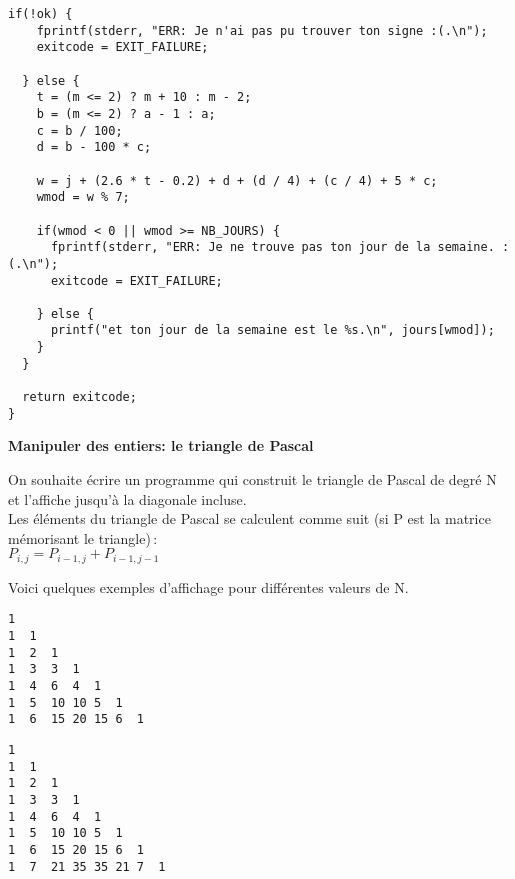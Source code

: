 \documentclass[10pt]{article}\usepackage[enonce]{exemptty}
\begin{document}
\begin{Reponse}
\begin{minipage}{\linewidth}
\begin{Verbatim}[label=Reponse aux 3 questions de l'exercice 2 proposee par Julien]
  if(!ok) {
    fprintf(stderr, "ERR: Je n'ai pas pu trouver ton signe :(.\n");
    exitcode = EXIT_FAILURE;

  } else {
    t = (m <= 2) ? m + 10 : m - 2;
    b = (m <= 2) ? a - 1 : a;
    c = b / 100;
    d = b - 100 * c;

    w = j + (2.6 * t - 0.2) + d + (d / 4) + (c / 4) + 5 * c;
    wmod = w % 7;

    if(wmod < 0 || wmod >= NB_JOURS) {
      fprintf(stderr, "ERR: Je ne trouve pas ton jour de la semaine. :(.\n");
      exitcode = EXIT_FAILURE;

    } else {
      printf("et ton jour de la semaine est le %s.\n", jours[wmod]);
    }
  }

  return exitcode;
}
  \end{Verbatim}
\end{minipage}\hfill


\end{Reponse}



\bigskip\Exercice\textbf{Manipuler des entiers: le triangle de Pascal}

On souhaite écrire un programme qui construit le triangle de Pascal de
degré N et l'affiche jusqu'à la diagonale incluse. \\

Les éléments du triangle de Pascal se calculent comme suit (si P est
la matrice mémorisant le triangle)\,: \\
$P_{i,j} = P_{i-1,j} + P_{i-1,j-1}$

Voici quelques exemples d'affichage pour différentes valeurs de N.

\bigskip\noindent\begin{minipage}{.45\linewidth}
  \begin{Verbatim}[label=Affichage quand N vaut 6]
1 
1  1
1  2  1
1  3  3  1
1  4  6  4  1
1  5  10 10 5  1
1  6  15 20 15 6  1    
  \end{Verbatim}
\end{minipage}\hfill
\begin{minipage}{.45\linewidth}
  \begin{Verbatim}[label=Affichage quand N vaut 7]
1 
1  1
1  2  1
1  3  3  1
1  4  6  4  1
1  5  10 10 5  1
1  6  15 20 15 6  1    
1  7  21 35 35 21 7  1
  \end{Verbatim}
\end{minipage}
\end{document}
